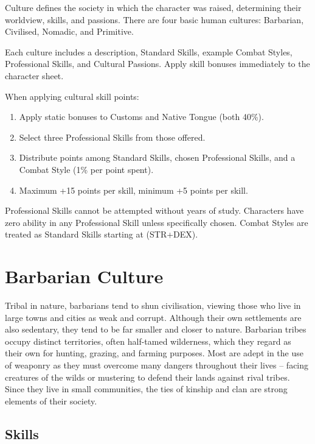 \documentclass[10pt]{article}
\begin{document}
Culture defines the society in which the character was raised, determining their worldview, skills, and passions. There are four basic human cultures: Barbarian, Civilised, Nomadic, and Primitive.

Each culture includes a description, Standard Skills, example Combat Styles, Professional Skills, and Cultural Passions. Apply skill bonuses immediately to the character sheet.

When applying cultural skill points:
\begin{enumerate}
    \item Apply static bonuses to Customs and Native Tongue (both 40\%).
    \item Select three Professional Skills from those offered.
    \item Distribute points among Standard Skills, chosen Professional Skills, and a Combat Style (1\% per point spent).
    \item Maximum +15 points per skill, minimum +5 points per skill.
\end{enumerate}

Professional Skills cannot be attempted without years of study. Characters have zero ability in any Professional Skill unless specifically chosen. Combat Styles are treated as Standard Skills starting at (STR+DEX).

\section{Barbarian Culture}
\label{sec:barbarian}

Tribal in nature, barbarians tend to shun civilisation, viewing those who live in large towns and cities as weak and corrupt. Although their own settlements are also sedentary, they tend to be far smaller and closer to nature. Barbarian tribes occupy distinct territories, often half-tamed wilderness, which they regard as their own for hunting, grazing, and farming purposes. Most are adept in the use of weaponry as they must overcome many dangers throughout their lives – facing creatures of the wilds or mustering to defend their lands against rival tribes. Since they live in small communities, the ties of kinship and clan are strong elements of their society.


\subsection{Skills}
\label{sec:barbarian-skills}
\end{document}
